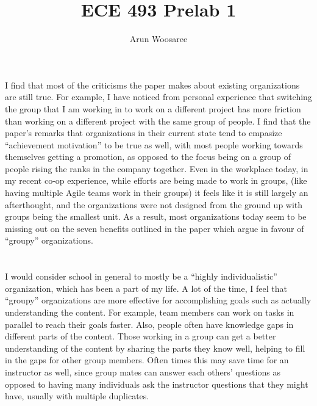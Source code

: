 \documentclass[letterpaper,12pt]{article}
\title{ECE 493 Prelab 1}
\author{Arun Woosaree\\
}
\begin{document}
\maketitle
  \section{}
  I find that most of the criticisms the paper makes about existing
  organizations are still true. For example, I have noticed from personal
  experience that switching the group that I am working in to work on a
  different project has more friction than working on a different project with
  the same group of people. I find that the paper's remarks that organizations
  in their current state tend to empasize ``achievement motivation'' to be true
  as well, with most people working towards themselves getting a promotion, as
  opposed to the focus being on a group of people rising the ranks in the
  company together.  Even in the workplace today, in my recent co-op
  experience, while efforts are being made to work in groups, (like having
  multiple Agile teams work in their groups) it feels like it is still largely
  an afterthought, and the organizations were not designed from the ground up
  with groups being the smallest unit. As a result, most organizations today
  seem to be missing out on the seven benefits outlined in the paper which
  argue in favour of ``groupy'' organizations.


  \section{}
  I would consider school in general to mostly be a ``highly individualistic''
  organization, which has been a part of my life.  A lot of the time, I feel
  that ``groupy'' organizations are more effective for accomplishing goals such
  as actually understanding the content.  For example, team members can work on
  tasks in parallel to reach their goals faster. Also, people often have
  knowledge gaps in different parts of the content. Those working in a group
  can get a better understanding of the content by sharing the parts they know
  well, helping to fill in the gaps for other group members. Often times this
  may save time for an instructor as well, since group mates can answer each
  others' questions as opposed to having many individuals ask the instructor
  questions that they might have, usually with multiple duplicates.
\end{document}
